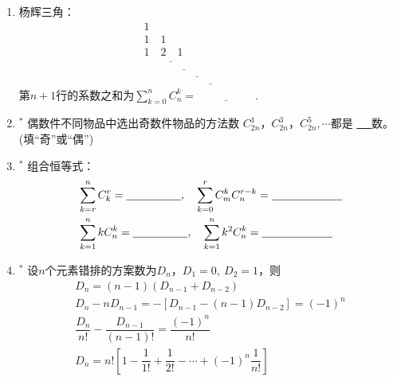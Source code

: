 \documentclass{article}
\newif\ifte
\newcommand{\q}{\quad}
\begin{document}
\begin{multicols}{2}
\begin{enumerate}[leftmargin=20pt]
\item 杨辉三角：
\vspace{-3mm}
\begin{gather*}
    1 \\
    1\q 1 \\
    1\q 2 \q 1 \\
    \ifte 
    \underline{1\q 3 \q 3 \q 1} \\
    \underline{1\q 4 \q 6 \q 4 \q 1} \\
    \underline{1\q 5 \q 10 \q 10 \q 5 \q 1} \\
    \underline{1\q 6 \q 15 \q 20 \q 15 \q 6 \q 1} 
    \else
    \underline{\hspace{2cm}} \\
    \underline{\hspace{3cm}} \\
    \underline{\hspace{4cm}} \\
    \underline{\hspace{5cm}}   
    \fi 
\end{gather*}
第$ n+1 $行的系数之和为$ \sum\limits_{k=0}^{n} C_n^k=
\underline{\ \ifte 2^{n} \else \hspace{2cm} \fi\ } $.

\item $^*$ 偶数件不同物品中选出奇数件物品的方法数
$ C_{2n}^1 $，$ C_{2n}^3 $，$ C_{2n}^5,\cdots $都是
\underline{\ \ifte 偶\else \hspace{0.5 cm} \fi\ }数。
\ifte \else (填“奇”或“偶”) \fi

\item $^*$ 组合恒等式：
\begin{align*}
&\sum_{k=r}^{n} C_k^r=\underline{\ \ifte C_{n+1}^{r+1}
     \else \hspace{1.5cm} \fi\ },\q
\sum_{k=0}^{r}C_m^kC_n^{r-k}=\underline{\ \ifte 
    C_{n+m}^r \else \hspace{2cm} \fi\ }  \\
&\sum_{k=1}^{n} kC_n^k=\underline{\ \ifte n\cdot2^{n-1} 
     \else \hspace{1.5cm} \fi\ },\q 
\sum_{k=1}^{n} k^2C_n^k=\underline{\ \ifte 
    n(n+1)\cdot2^{n-2} \else \hspace{2cm} \fi\ } 
\end{align*}

\item $^*$ 设$ n $个元素错排的方案数为$ D_n $，$ D_1=0,\ D_2=1 $，则
\begin{gather*}
    D_n =(n-1)(D_{n-1}+D_{n-2}) \\
    D_n-nD_{n-1}=-[D_{n-1}-(n-1)D_{n-2}]=(-1)^n \\
    \dfrac{D_n}{n!}-\dfrac{D_{n-1}}{(n-1)!}=\dfrac{(-1)^n}{n!} \\
    D_n= n!\left[ 1-\dfrac{1}{1!}+\dfrac{1}{2!}-\cdots 
    +(-1)^n\dfrac{1}{n!}\right]
\end{gather*}


\end{enumerate}
\end{multicols}
\end{document}
